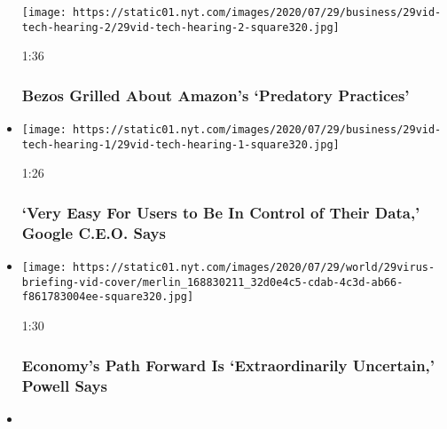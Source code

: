 \begin{itemize}
  \texttt{[image: https://static01.nyt.com/images/2020/07/29/business/29vid-tech-hearing-2/29vid-tech-hearing-2-square320.jpg]}

  1:36

  \hypertarget{bezos-grilled-about-amazons-predatory-practices}{%
  \subsubsection{Bezos Grilled About Amazon's `Predatory
  Practices'}\label{bezos-grilled-about-amazons-predatory-practices}}
\item
  \href{https://www.nytimes.com/video/us/politics/100000007263148/google-data-privacy.html?action=click\&module=video-series-bar\&region=header\&pgtype=Article\&playlistId=video/u-s}{}

  \texttt{[image: https://static01.nyt.com/images/2020/07/29/business/29vid-tech-hearing-1/29vid-tech-hearing-1-square320.jpg]}

  1:26

  \hypertarget{very-easy-for-users-to-be-in-control-of-their-data-google-ceo-says}{%
  \subsubsection{`Very Easy For Users to Be In Control of Their Data,'
  Google C.E.O.
  Says}\label{very-easy-for-users-to-be-in-control-of-their-data-google-ceo-says}}
\item
  \href{https://www.nytimes.com/video/us/100000007262574/fed-powell-economy-coronavirus.html?action=click\&module=video-series-bar\&region=header\&pgtype=Article\&playlistId=video/u-s}{}

  \texttt{[image: https://static01.nyt.com/images/2020/07/29/world/29virus-briefing-vid-cover/merlin\_168830211\_32d0e4c5-cdab-4c3d-ab66-f861783004ee-square320.jpg]}

  1:30

  \hypertarget{economys-path-forward-is-extraordinarily-uncertain-powell-says}{%
  \subsubsection{Economy's Path Forward Is `Extraordinarily Uncertain,'
  Powell
  Says}\label{economys-path-forward-is-extraordinarily-uncertain-powell-says}}
\item
  \href{https://www.nytimes.com/video/us/100000007260854/san-francisco-fire.html?action=click\&module=video-series-bar\&region=header\&pgtype=Article\&playlistId=video/u-s}{}


\end{itemize}

